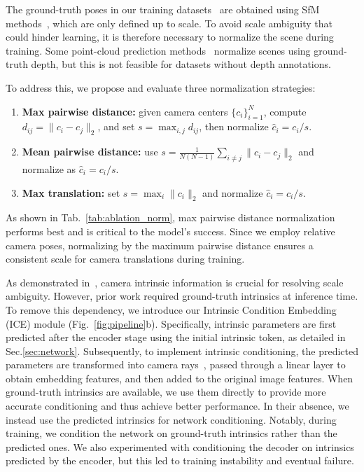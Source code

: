 The ground-truth poses in our training datasets~\cite{re10k, dl3dv} are obtained using SfM methods~\cite{colmap}, which are only defined up to scale. To avoid scale ambiguity that could hinder learning, it is therefore necessary to normalize the scene during training. Some point-cloud prediction methods~\cite{dust3r, vggt} normalize scenes using ground-truth depth, but this is not feasible for datasets without depth annotations.

To address this, we propose and evaluate three normalization strategies:
\begin{enumerate}[leftmargin=*, itemsep=0pt, topsep=0pt, parsep=0pt, partopsep=0pt]  
    \item \textbf{Max pairwise distance:} given camera centers $\{c_i\}_{i=1}^N$, compute $d_{ij}=\|c_i-c_j\|_2$, and set $s=\max_{i,j} d_{ij}$, then normalize $\hat{c}_i=c_i/s$.  
    \item \textbf{Mean pairwise distance:} use $s=\tfrac{1}{N(N-1)}\sum_{i \neq j}\|c_i-c_j\|_2$ and normalize as $\hat{c}_i=c_i/s$.  
    \item \textbf{Max translation:} set $s=\max_i \|c_i\|_2$ and normalize $\hat{c}_i=c_i/s$.  
\end{enumerate}  

As shown in Tab.~\ref{tab:ablation_norm}, max pairwise distance normalization performs best and is critical to the model’s success. Since we employ relative camera poses, normalizing by the maximum pairwise distance ensures a consistent scale for camera translations during training.

As demonstrated in~\citep{noposplat}, camera intrinsic information is crucial for resolving scale ambiguity. However, prior work required ground-truth intrinsics at inference time. 
To remove this dependency, we introduce our Intrinsic Condition Embedding (ICE) module (Fig.~\ref{fig:pipeline}b).
Specifically, intrinsic parameters are first predicted after the encoder stage using the initial intrinsic token, as detailed in Sec.\ref{sec:network}. 
Subsequently, to implement intrinsic conditioning, the predicted parameters are transformed into camera rays~\citep{noposplat}, passed through a linear layer to obtain embedding features, and then added to the original image features.
When ground-truth intrinsics are available, we use them directly to provide more accurate conditioning and thus achieve better performance. In their absence, we instead use the predicted intrinsics for network conditioning. Notably, during training, we condition the network on ground-truth intrinsics rather than the predicted ones. We also experimented with conditioning the decoder on intrinsics predicted by the encoder, but this led to training instability and eventual failure.


